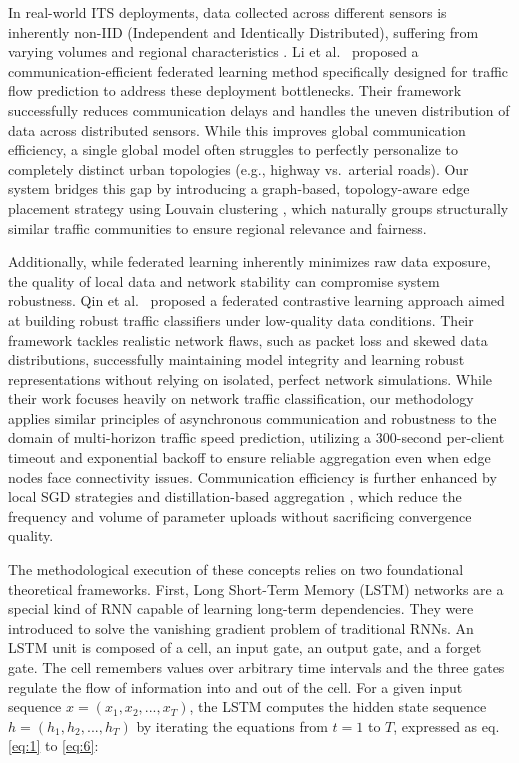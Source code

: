 \documentclass[pdflatex,sn-mathphys-num]{sn-jnl}
\theoremstyle{thmstyleone}
\theoremstyle{thmstyletwo}
\theoremstyle{thmstylethree}
\begin{document}
In real-world ITS deployments, data collected across different sensors is inherently non-IID (Independent and Identically Distributed), suffering from varying volumes and regional characteristics \cite{Zhao2018FederatedNonIID}. Li et al.\ \cite{li2024fedasta} proposed a communication-efficient federated learning method specifically designed for traffic flow prediction to address these deployment bottlenecks. Their framework successfully reduces communication delays and handles the uneven distribution of data across distributed sensors. While this improves global communication efficiency, a single global model often struggles to perfectly personalize to completely distinct urban topologies (e.g., highway vs.\ arterial roads). Our system bridges this gap by introducing a graph-based, topology-aware edge placement strategy using Louvain clustering \cite{blondel2008louvain}, which naturally groups structurally similar traffic communities to ensure regional relevance and fairness.

Additionally, while federated learning inherently minimizes raw data exposure, the quality of local data and network stability can compromise system robustness. Qin et al.\ \cite{qin2025fedcontrastive} proposed a federated contrastive learning approach aimed at building robust traffic classifiers under low-quality data conditions. Their framework tackles realistic network flaws, such as packet loss and skewed data distributions, successfully maintaining model integrity and learning robust representations without relying on isolated, perfect network simulations. While their work focuses heavily on network traffic classification, our methodology applies similar principles of asynchronous communication and robustness to the domain of multi-horizon traffic speed prediction, utilizing a 300-second per-client timeout and exponential backoff to ensure reliable aggregation even when edge nodes face connectivity issues. Communication efficiency is further enhanced by local SGD strategies \cite{lin2017deep} and distillation-based aggregation \cite{park2020privacy}, which reduce the frequency and volume of parameter uploads without sacrificing convergence quality.

The methodological execution of these concepts relies on two foundational theoretical frameworks. First, Long Short-Term Memory (LSTM) networks \cite{hochreiter1997lstm} are a special kind of RNN capable of learning long-term dependencies. They were introduced to solve the vanishing gradient problem of traditional RNNs. An LSTM unit is composed of a cell, an input gate, an output gate, and a forget gate. The cell remembers values over arbitrary time intervals and the three gates regulate the flow of information into and out of the cell. For a given input sequence $x=(x_{1},x_{2},...,x_{T})$, the LSTM computes the hidden state sequence $h=(h_{1},h_{2},...,h_{T})$ by iterating the equations from $t=1$ to $T$, expressed as eq.\eqref{eq:1} to \eqref{eq:6}:
\end{document}
